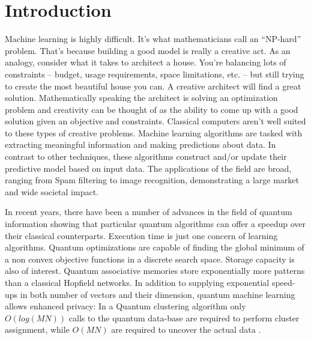 \chapter{Introduction}\label{ch:introduction}

Machine learning is highly difficult. It’s what mathematicians call an “NP-hard” problem. That’s because building a good model is really a creative act. As an analogy, consider what it takes to architect a house. You’re balancing lots of constraints -- budget, usage requirements, space limitations, etc. -- but still trying to create the most beautiful house you can. A creative architect will find a great solution. Mathematically speaking the architect is solving an optimization problem and creativity can be thought of as the ability to come up with a good solution given an objective and constraints. Classical computers aren’t well suited to these types of creative problems. Machine learning algorithms are tasked with extracting meaningful information and making predictions about data. In contrast to other techniques, these algorithms construct and/or update their predictive model based on input data. The applications of the field are broad, ranging from Spam filtering to image recognition, demonstrating a large market and wide societal impact.\par\bigskip
In recent years, there have been a number of advances in the field of quantum information showing that particular quantum algorithms can offer a speedup over their classical counterparts. Execution time is just one concern of learning algorithms. Quantum optimizations are capable of finding the global minimum of a non convex objective functions in a discrete search space. Storage capacity is also of interest. Quantum associative memories store exponentially more patterns than a classical Hopfield networks. In addition to supplying exponential speed-ups in both number of vectors and their dimension, quantum machine learning allows enhanced privacy: In a Quantum clustering algorithm only $O(log(MN))$ calls to the quantum data-base are required to perform cluster assignment, while $O(MN)$ are required to uncover the actual data \cite{kmeans}.\par\bigskip
